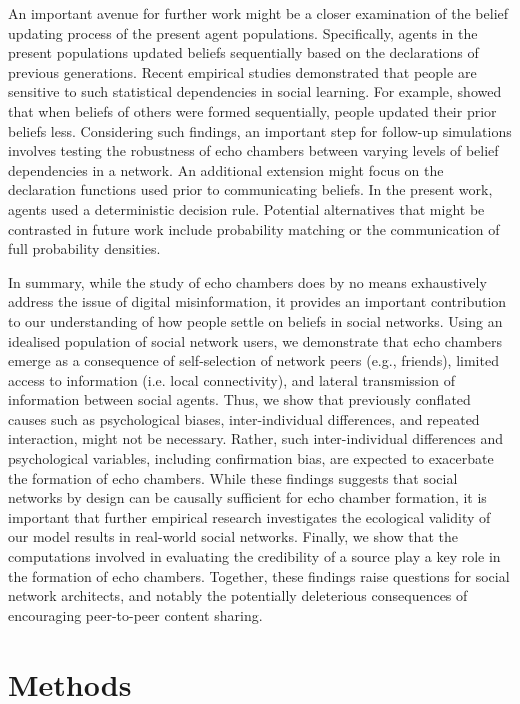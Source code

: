 \documentclass[fleqn,10pt]{wlscirep}
\begin{document}
An important avenue for further work might be a closer examination of the belief updating process of the present agent populations. Specifically, agents in the present populations updated beliefs sequentially based on the declarations of previous generations. Recent empirical studies demonstrated that people are sensitive to such statistical dependencies in social learning. For example, \cite{whalen} showed that when beliefs of others were formed sequentially, people updated their prior beliefs less. Considering such findings, an important step for follow-up simulations involves testing the robustness of echo chambers between varying levels of belief dependencies in a network. An additional extension might focus on the declaration functions used prior to communicating beliefs. In the present work, agents used a deterministic decision rule. Potential alternatives that might be contrasted in future work include probability matching \cite{shanks2002re} or the communication of full probability densities.

In summary, while the study of echo chambers does by no means exhaustively address the issue of digital misinformation, it provides an important contribution to our understanding of how people settle on beliefs in social networks. Using an idealised population of social network users, we demonstrate that echo chambers emerge as a consequence of self-selection of network peers (e.g., friends), limited access to information (i.e. local connectivity), and lateral transmission of information between social agents. Thus, we show that previously conflated causes such as psychological biases, inter-individual differences, and repeated interaction, might not be necessary. Rather, such inter-individual differences and psychological variables, including confirmation bias, are expected to exacerbate the formation of echo chambers. While these findings suggests that social networks by design can be causally sufficient for echo chamber formation, it is important that further empirical research investigates the ecological validity of our model results in real-world social networks. Finally, we show that the computations involved in evaluating the credibility of a source play a key role in the formation of echo chambers. Together, these findings raise questions for social network architects, and notably the potentially deleterious consequences of encouraging peer-to-peer content sharing.


\section*{Methods}
\end{document}
